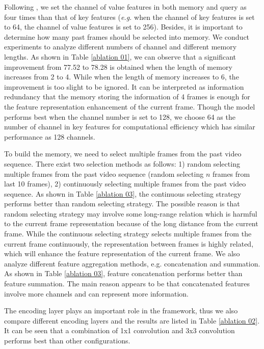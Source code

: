 \documentclass{article}
\begin{document}
	Following \cite{STA2019}, we set the channel of value features in both memory and query as four times than that of key features (\emph{e.g.} when the channel of key features is set to 64, the channel of value features is set to 256). Besides, it is important to determine how many past frames should be selected into memory. 
	We conduct experiments to analyze different numbers of channel and different memory lengths. As shown in Table \ref{ablation 01}, we can observe that a significant improvement from 77.52 to 78.28 is obtained when the length of memory increases from 2 to 4. While when the length of memory increases to 6, the improvement is too slight to be ignored. 
	It can be interpreted as information redundancy that the memory storing the information of 4 frames is enough for the feature representation enhancement of the current frame.
	Though the model performs best when the channel number is set to 128, we choose 64 as the number of channel in key features for computational efficiency which has similar performance as 128 channels.  
	
	To build the memory, we need to select multiple frames from the past video sequence.
	There exist two selection methods as follows: 1) random selecting multiple frames from the past video sequence (random selecting $n$ frames from last 10 frames), 2) continuously selecting multiple frames from the past video sequence. 
	As shown in Table \ref{ablation 03},  the continuous selecting strategy performs better than random selecting strategy. The possible reason is that random selecting strategy may involve some long-range relation which is harmful to the current frame representation because of the long distance from the current frame. While the continuous selecting strategy selects multiple frames from the current frame continuously, the representation between frames is highly related, which will enhance the feature representation of the current frame. We also analyze different feature aggregation methods, e.g. concatenation and summation. As shown in Table \ref{ablation 03}, feature concatenation performs better than feature summation. The main reason appears to be that concatenated features involve more channels and can represent more information. 
	
The encoding layer plays an important role in the framework, thus we also compare different encoding layers and the results are listed in Table \ref{ablation 02}. It can be seen that a combination of  1x1 convolution and  3x3 convolution performs best than other configurations. 
	
\end{document}
